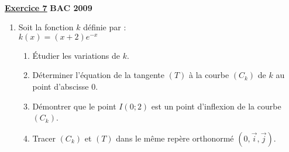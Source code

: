 \documentclass[12pt,a4paper]{article}
\newcommand{\exo}[1]{%
        \textbf{\underline{Exercice #1}}
}
\begin{document}
\renewcommand{\arraystretch}{1.5}
\renewcommand{\arrayrulewidth}{1.2pt}
\\
\vspace{3cm}

\exo{7} \textbf{BAC 2009}

\begin{enumerate}
    
    \item Soit la fonction \( k \) définie par :\\ \( k(x) = (x + 2)e^{-x} \)
    \begin{enumerate}
        \item Étudier les variations de \( k \).
        \item Déterminer l’équation de la tangente \( (T) \) à la courbe \( (C_k) \) de \( k \) au point d’abscisse 0.
        \item Démontrer que le point \( I(0;2) \) est un point d’inflexion de la courbe \( (C_k) \).
        \item Tracer \( (C_k) \) et \( (T) \) dans le même repère orthonormé \( (0,\vec{i},\vec{j}) \).
    \end{enumerate}
\end{enumerate}
\end{document}

